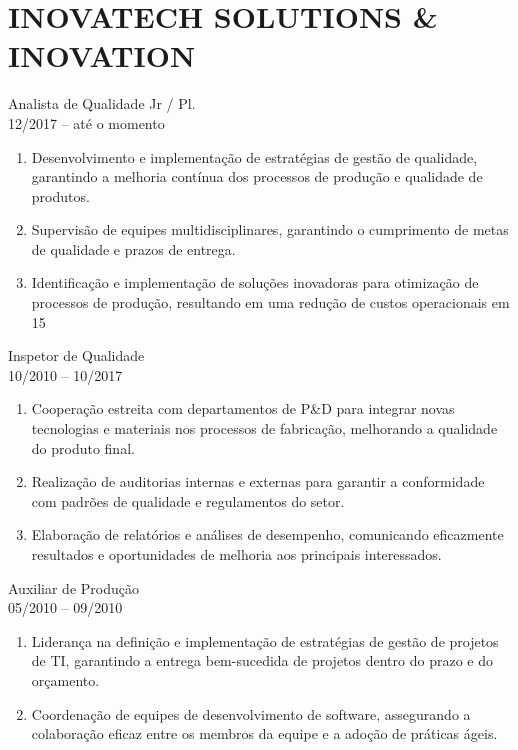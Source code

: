 \documentclass[10.5pt, a4paper]{report}
\begin{document}
\vspace{10pt}
\section{INOVATECH SOLUTIONS \& INOVATION}

Analista de Qualidade Jr / Pl.
\vspace{3pt}\\
{\footnotesize 12/2017 – até o momento}
\begin{enumerate}[leftmargin=32pt, topsep=15pt, itemsep=8pt, labelsep=10pt, align=left]
  \item Desenvolvimento e implementação de estratégias de gestão de qualidade, garantindo a melhoria contínua dos processos de produção e qualidade de produtos.
  \item Supervisão de equipes multidisciplinares, garantindo o cumprimento de metas de qualidade e prazos de entrega.
  \item Identificação e implementação de soluções inovadoras para otimização de processos de produção, resultando em uma redução de custos operacionais em 15%
\end{enumerate}

Inspetor de Qualidade
\vspace{3pt}\\
{\footnotesize 10/2010 – 10/2017}
\begin{enumerate}[leftmargin=32pt, topsep=15pt, itemsep=8pt, labelsep=10pt, align=left]
  \item Cooperação estreita com departamentos de P\&D para integrar novas tecnologias e materiais nos processos de fabricação, melhorando a qualidade do produto final.
  \item Realização de auditorias internas e externas para garantir a conformidade com padrões de qualidade e regulamentos do setor.
  \item Elaboração de relatórios e análises de desempenho, comunicando eficazmente resultados e oportunidades de melhoria aos principais interessados.
\end{enumerate}

Auxiliar de Produção
\vspace{3pt}\\
{\footnotesize 05/2010 – 09/2010}
\begin{enumerate}[leftmargin=32pt, topsep=15pt, itemsep=8pt, labelsep=10pt, align=left]
  \item Liderança na definição e implementação de estratégias de gestão de projetos de TI, garantindo a entrega bem-sucedida de projetos dentro do prazo e do orçamento.
  \item Coordenação de equipes de desenvolvimento de software, assegurando a colaboração eficaz entre os membros da equipe e a adoção de práticas ágeis.
\end{enumerate}
\end{document}

